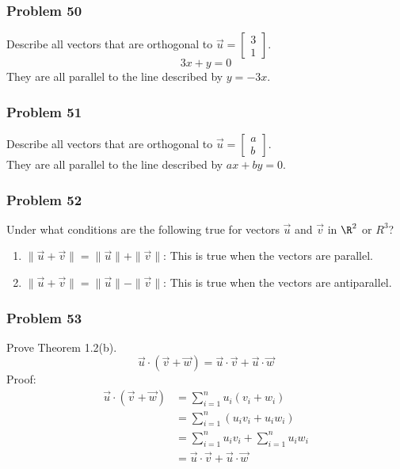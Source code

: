 \documentclass[letterpaper, 12pt]{math}
\begin{document}
\subsubsection*{Problem 50}
Describe all vectors that are orthogonal to \( \vec{u} = \begin{bmatrix}3 \\ 1
\end{bmatrix} \).
\[ 3x+y = 0 \]
They are all parallel to the line described by \( y = -3x \).

\subsubsection*{Problem 51}
Describe all vectors that are orthogonal to \( \vec{u} = \begin{bmatrix}a \\ b
\end{bmatrix} \). \\
They are all parallel to the line described by \( ax+by = 0 \).

\subsubsection*{Problem 52}
Under what conditions are the following true for vectors \( \vec{u} \) and
\( \vec{v} \) in \( \R^2 \) or \( R^3 \)?
\begin{enumerate}
  \item \( \|\vec{u}+\vec{v}\| = \|\vec{u}\|+\|\vec{v}\| \):
    This is true when the vectors are parallel.
  \item \( \|\vec{u}+\vec{v}\| = \|\vec{u}\|-\|\vec{v}\| \):
    This is true when the vectors are antiparallel.
\end{enumerate}

\subsubsection*{Problem 53}
Prove Theorem 1.2(b).
\[ \vec{u}\cdot(\vec{v}+\vec{w}) = \vec{u}\cdot\vec{v}+\vec{u}\cdot\vec{w} \]
Proof:
\begin{align*}
  \vec{u}\cdot(\vec{v}+\vec{w}) &= \sum_{i=1}^{n}u_{i}(v_{i}+w_{i}) \\
  &= \sum_{i=1}^{n}(u_{i}v_{i}+u_{i}w_{i}) \\
  &= \sum_{i=1}^{n}u_{i}v_{i}+\sum_{i=1}^{n}u_{i}w_{i} \\
  &= \vec{u}\cdot\vec{v}+\vec{u}\cdot\vec{w}
\end{align*}
\end{document}
